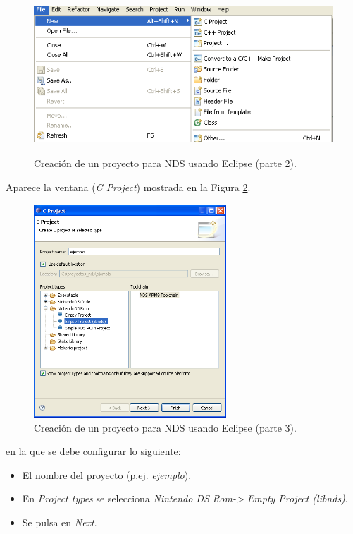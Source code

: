 \begin{figure}[t]
\centering
\includegraphics[height=6cm]{./Figuras/C2/c2_eclipse2.png}
\caption{Creación de un proyecto para NDS usando Eclipse (parte 2).}
\label{fig_c2_eclipse2}
\end{figure}

Aparece la ventana (\textit{C Project}) mostrada en la Figura \ref{fig_c2_eclipse3}.

\begin{figure}[t]
\centering
\includegraphics[height=8cm]{./Figuras/C2/c2_eclipse3.png}
\caption{Creación de un proyecto para NDS usando Eclipse (parte 3).}
\label{fig_c2_eclipse3}
 \end{figure}

\noindent en la que se debe configurar lo siguiente:
\begin{itemize}
\item El nombre del proyecto (p.ej. \textit{ejemplo}).
\item En \textit{Project types} se selecciona \textit{Nintendo DS Rom-> Empty Project (libnds)}.
\item Se pulsa en \textit{Next}.
\end{itemize}

